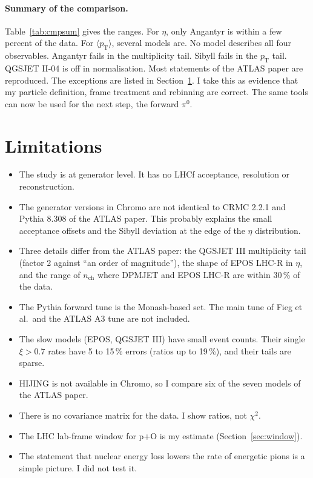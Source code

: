 \documentclass[11pt,a4paper]{article}
\newcommand{\pizero}{\ensuremath{\pi^{0}}}
\newcommand{\pT}{\ensuremath{p_{\mathrm{T}}}}
\newcommand{\nch}{\ensuremath{n_{\mathrm{ch}}}}
\begin{document}
\paragraph{Summary of the comparison.}
Table~\ref{tab:cmpsum} gives the ranges.
For $\eta$, only Angantyr is within a few percent of the data.
For $\langle\pT\rangle$, several models are.
No model describes all four observables.
Angantyr fails in the multiplicity tail.
Sibyll fails in the $\pT$ tail.
QGSJET II-04 is off in normalisation.
Most statements of the ATLAS paper are reproduced.
The exceptions are listed in Section~\ref{sec:limits}.
I take this as evidence that my particle definition, frame treatment and rebinning are correct.
The same tools can now be used for the next step, the forward \pizero.

\section{Limitations}
\label{sec:limits}
\begin{itemize}
  \item The study is at generator level. It has no LHCf acceptance, resolution or reconstruction.
  \item The generator versions in Chromo are not identical to CRMC 2.2.1 and Pythia 8.308 of the ATLAS paper. This probably explains the small acceptance offsets and the Sibyll deviation at the edge of the $\eta$ distribution.
  \item Three details differ from the ATLAS paper: the QGSJET III multiplicity tail (factor 2 against ``an order of magnitude''), the shape of EPOS LHC-R in $\eta$, and the range of $\nch$ where DPMJET and EPOS LHC-R are within 30\,\% of the data.
  \item The Pythia forward tune is the Monash-based set. The main tune of Fieg et al.\ and the ATLAS A3 tune are not included.
  \item The slow models (EPOS, QGSJET III) have small event counts. Their single $\xi>0.7$ rates have 5 to 15\,\% errors (ratios up to 19\,\%), and their tails are sparse.
  \item HIJING is not available in Chromo, so I compare six of the seven models of the ATLAS paper.
  \item There is no covariance matrix for the data. I show ratios, not $\chi^{2}$.
  \item The LHC lab-frame window for p+O is my estimate (Section~\ref{sec:window}).
  \item The statement that nuclear energy loss lowers the rate of energetic pions is a simple picture. I did not test it.
\end{itemize}
\end{document}
